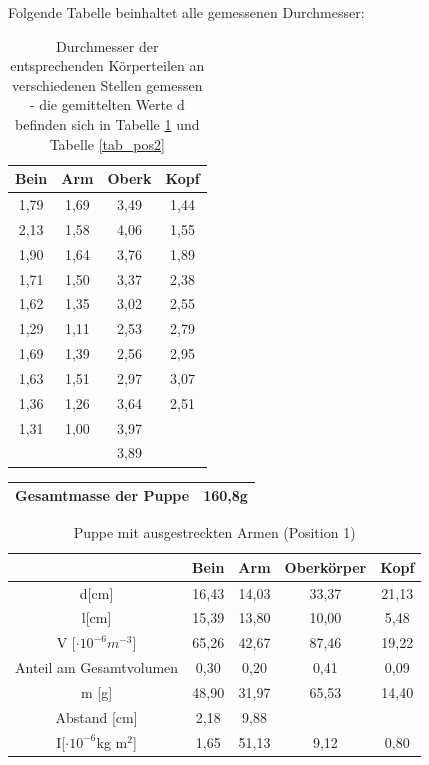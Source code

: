 Folgende Tabelle beinhaltet alle gemessenen Durchmesser:
\begin{table}[H]
\begin{tabular}{|c|c|c|c|}
\hline 
Bein&	Arm	&Oberk	&Kopf	\\ \hline
1,79&	1,69&	3,49&	1,44\\ \hline
2,13&	1,58&	4,06&	1,55\\ \hline
1,90&	1,64&	3,76&	1,89\\ \hline
1,71&	1,50&	3,37&	2,38\\ \hline
1,62&	1,35&	3,02&	2,55\\ \hline
1,29&	1,11&	2,53&	2,79\\ \hline
1,69&	1,39&	2,56&	2,95\\ \hline
1,63&	1,51&	2,97&	3,07\\ \hline
1,36&	1,26&	3,64&	2,51\\ \hline
1,31&	1,00&	3,97&		\\ \hline
	&	&		3,89		&		\\ \hline
\end{tabular}
\caption{Durchmesser der entsprechenden Körperteilen an verschiedenen Stellen gemessen - die gemittelten Werte d befinden sich in Tabelle \ref{tab_pos1} und Tabelle \ref{tab_pos2}}
\end{table}
\begin{table}[H]
\begin{tabular}{|c|c|}
\hline
Gesamtmasse der Puppe & 160,8g \\ \hline
\end{tabular} 
\end{table}

\begin{table}[H]
\begin{tabular}{|c|c|c|c|c|}
\hline 		
&	Bein&	Arm	&Oberkörper	&Kopf	\\ \hline	
d[cm]&	16,43	&14,03&	33,37&	21,13		\\ \hline		
l[cm]&	15,39&	13,80&	10,00	&5,48\\ \hline
V [$\cdot 10^{-6}m^{-3}$]& 65,26&	42,67	&87,46&	19,22\\ \hline		
Anteil am Gesamtvolumen&	0,30	&0,20&	0,41&	0,09\\ \hline
m [g]&	48,90&	31,97	&65,53&	14,40\\ \hline
Abstand [cm] & 2,18	& 9,88	&&\\ \hline	
I[$\cdot 10^{-6}$kg m$^2$]&1,65&	51,13&	9,12&	0,80\\ \hline
\end{tabular} 
\caption{Puppe mit ausgestreckten Armen (Position 1)}
\label{tab_pos1}
\end{table}


